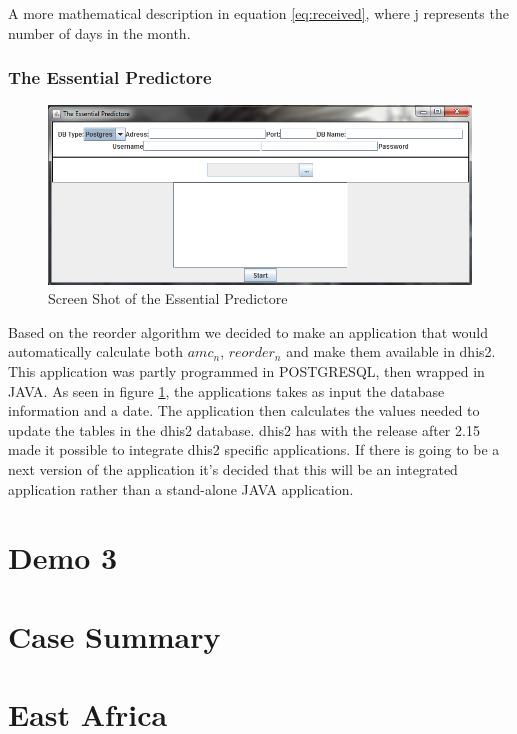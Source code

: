 A more mathematical description in equation \ref{eq:received}, where j represents the number of days in the month.

\subsubsection{The Essential Predictore}

\begin{figure}
\centering
\includegraphics[width=\textwidth]{case/img/essentialPredictoreScreenShot}
\caption{Screen Shot of the Essential Predictore}
\label{fig:essPred}
\end{figure}

Based on the reorder algorithm we decided to make an application that would automatically calculate both $amc_{n}$, $reorder_{n}$ and make them available in \gls{dhis2}. This application was partly programmed in POSTGRESQL, then wrapped in JAVA. 
As seen in figure \ref{fig:essPred}, the applications takes as input the database information and a date. 
The application then calculates the values needed to update the tables in the \gls{dhis2} database. 
\gls{dhis2} has with the release after 2.15 made it possible to integrate \gls{dhis2} specific applications. 
If there is going to be a next version of the application it's decided that this will be an integrated application rather than a stand-alone JAVA application. 

\section{Demo 3}


\section{Case Summary}


\section{East Africa}

